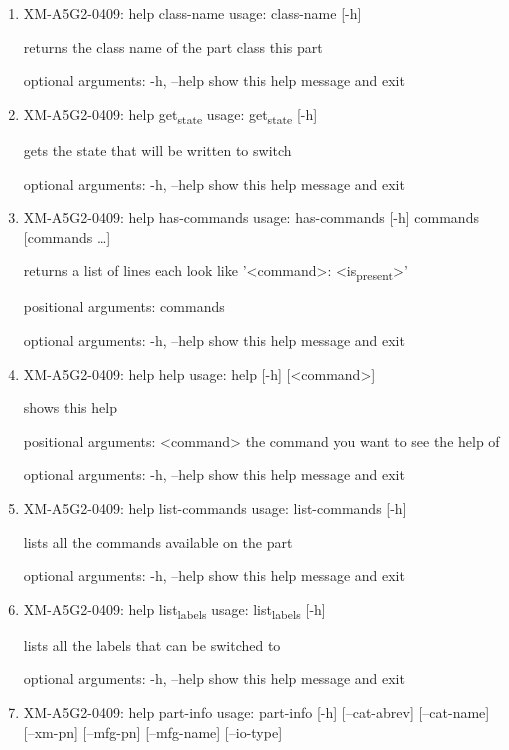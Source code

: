 \documentclass[11pt]{article}
\begin{document}
\begin{enumerate}
\item XM-A5G2-0409: help class-name
\label{sec:org1b5077a}
usage: class-name [-h]

returns the class name of the part class this part

optional arguments:
  -h, --help  show this help message and exit

\item XM-A5G2-0409: help get\textsubscript{state}
\label{sec:orgb8b50b2}
usage: get\textsubscript{state} [-h]

gets the state that will be written to switch

optional arguments:
  -h, --help  show this help message and exit

\item XM-A5G2-0409: help has-commands
\label{sec:orgac8bc2f}
usage: has-commands [-h] commands [commands \ldots{}]

returns a list of lines each look like '<command>: <is\textsubscript{present}>'

positional arguments:
  commands

optional arguments:
  -h, --help  show this help message and exit

\item XM-A5G2-0409: help help
\label{sec:orgf4eacf8}
usage: help [-h] [<command>]

shows this help

positional arguments:
  <command>   the command you want to see the help of

optional arguments:
  -h, --help  show this help message and exit

\item XM-A5G2-0409: help list-commands
\label{sec:org536542b}
usage: list-commands [-h]

lists all the commands available on the part

optional arguments:
  -h, --help  show this help message and exit

\item XM-A5G2-0409: help list\textsubscript{labels}
\label{sec:org9da9504}
usage: list\textsubscript{labels} [-h]

lists all the labels that can be switched to

optional arguments:
  -h, --help  show this help message and exit

\item XM-A5G2-0409: help part-info
\label{sec:org79d27e9}
usage: part-info  [-h] [--cat-abrev] [--cat-name] [--xm-pn] [--mfg-pn] [--mfg-name]
        [--io-type]


\end{enumerate}
\end{document}
